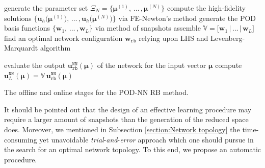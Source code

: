 \documentclass[longtitle]{elsarticle}
\numberwithin{equation}{section}
\theoremstyle{theorem}
\theoremstyle{definition}
\theoremstyle{remark}
\theoremstyle{proposition}
\numberwithin{figure}{section}
\newcommand{\bg}[1]{\boldsymbol{#1}}
\begin{document}
		\algrenewcommand\textproc{}
		
		\begin{algorithm}[t!]	
			\begin{algorithmic}[1]
					\State generate the parameter set $\Xi_N = \big\lbrace \bg{\mu}^{(1)}, \, \ldots \, , \bg{\mu}^{(N)} \big\rbrace$
					\State compute the high-fidelity solutions $\big\lbrace \mathbf{u}_h \big( \bg{\mu}^{(1)} \big), \, \ldots \, , \mathbf{u}_h \big( \bg{\mu}^{(N)} \big) \big\rbrace$ via FE-Newton's method
					\State generate the POD basis functions $\big\lbrace \mathbf{w}_1, \, \ldots \, , \mathbf{w}_L \big\rbrace$ via method of snapshots
					\State assemble $\mathbb{V} = \big[ \mathbf{w}_1 \, \big| \, \ldots \, \big| \, \mathbf{w}_L \big]$
					\State find an optimal network configuration $\mathbf{w}_{\texttt{rb}}$ relying upon LHS and Levenberg-Marquardt algorithm
				\EndFunction
				
				\vspace*{0.3cm}
				
				\setcounter{ALG@line}{0}
				
				\Function{$\mathbf{u}_L^{\texttt{NN}} (\bg{\mu}) = $ \textsc{PODNN\_online}}{$\bg{\mu}$, $\mathbb{V}$, $\mathbf{w}_{\texttt{rb}}$}
					\State evaluate the output $\mathbf{u}_{\texttt{rb}}^{\texttt{NN}}(\bg{\mu})$ of the network for the input vector $\bg{\mu}$
					\State compute $\mathbf{u}_L^{\texttt{NN}} (\bg{\mu}) = \mathbb{V} \, \mathbf{u}_{\texttt{rb}}^{\texttt{NN}}(\bg{\mu})$
				\EndFunction
			\end{algorithmic}
			
			\caption{The offline and online stages for the POD-NN RB method.}
			\label{alg:pod-nn}
		\end{algorithm}
		
		It should be pointed out that the design of an effective learning procedure may require a larger amount of snapshots than the generation of the reduced space does. Moreover, we mentioned in Subsection \ref{section:Network topology} the time-consuming yet unavoidable \emph{trial}-\emph{and}-\emph{error} approach which one should pursue in the search for an optimal network topology. To this end, we propose an automatic procedure.
\end{document}
